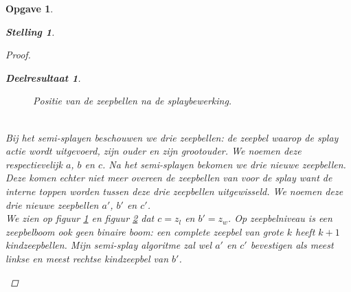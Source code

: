 \documentclass[12pt,hidelinks]{article}
\newtheorem{opgave}{Opgave}
\newtheorem{stelling}{Stelling}
\newtheorem{deelresultaat}{Deelresultaat}
\newcommand{\newln}{~\\\vspace{0.5em}}
\begin{document}
\begin{opgave}
\begin{description}
\begin{stelling}
\begin{proof}
\begin{deelresultaat}
\begin{figure}[H]
                            \label{semiVoor}
                        \end{figure}
                        \begin{figure}[H]
                            \centering
                            \caption{Positie van de zeepbellen na de splaybewerking.}
                            \label{semiNa}
                        \end{figure}
                        \newln
                        Bij het semi-splayen beschouwen we drie zeepbellen: de zeepbel waarop de splay actie wordt uitgevoerd, zijn ouder en zijn grootouder. 
                        We noemen deze respectievelijk $a$, $b$ en $c$.
                        Na het semi-splayen bekomen we drie nieuwe zeepbellen.
                        Deze komen echter niet meer overeen de zeepbellen van voor de splay want de interne toppen worden tussen deze drie zeepbellen uitgewisseld.
                        We noemen deze drie nieuwe zeepbellen $a'$, $b'$ en $c'$.
                        \newln
                        We zien op figuur \ref{semiVoor} en figuur \ref{semiNa} dat $c = z_l$ en $b' = z_w$.
                        Op zeepbelniveau is een zeepbelboom ook geen binaire boom: een complete zeepbel van grote $k$ heeft $k+1$ kindzeepbellen.
                        Mijn semi-splay algoritme zal wel $a'$ en $c'$ bevestigen als meest linkse en meest rechtse kindzeepbel van $b'$.

\end{deelresultaat}
\end{proof}
\end{stelling}
\end{description}
\end{opgave}
\end{document}
